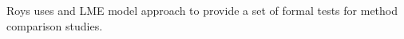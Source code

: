 \documentclass[12pt, a4paper]{report}
\theoremstyle{plain}
\theoremstyle{definition}
\theoremstyle{remark}
\begin{document}










Roys uses and LME model approach to provide a set of formal tests for method comparison studies.


\end{document}
